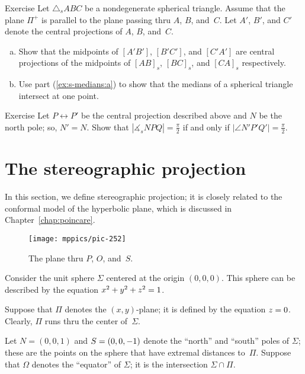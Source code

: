 \begin{thm}{Exercise}\label{ex:s-medians}
Let $\triangle_sABC$ be a nondegenerate spherical triangle.
Assume that the plane $\Pi^+$ is parallel to the plane passing thru $A$, $B$, and~$C$.
Let $A'$, $B'$, and $C'$ denote the central projections of $A$, $B$, and~$C$.
\begin{enumerate}[(a)]
\item\label{ex:s-medians:a} Show that the midpoints of $[A'B']$, $[B'C']$, and $[C'A']$
are central projections of the midpoints of $[AB]_s$, $[BC]_s$, and $[CA]_s$ respectively.
\item\label{ex:s-medians:b} Use part (\ref{ex:s-medians:a}) to show that the medians of a spherical triangle intersect at one point.
\end{enumerate}

\end{thm}


\begin{thm}{Exercise}\label{ex:s-altitudes}
Let $P\leftrightarrow P'$ be the central projection described above
and $N$ be the north pole; so, $N'=N$.
Show that $|\measuredangle_s NPQ|=\tfrac\pi2$ if and only if $|\angle N'P'Q'|=\tfrac\pi2$.
\end{thm}

\section{The stereographic projection}

In this section, we define stereographic projection;
it is closely related to the conformal model of the hyperbolic plane, which is discussed in Chapter~\ref{chap:poincare}.

{

\begin{wrapfigure}{r}{48mm}
\vskip-6mm
\centering
\texttt{[image: mppics/pic-252]}
\caption*{The plane thru $P$, $O$, and~$S$.}
\end{wrapfigure}

Consider the unit sphere $\Sigma$ 
centered at the origin $(0,0,0)$.
This sphere can be described by the equation $x^2+y^2+z^2=1$. 

Suppose that $\Pi$ denotes the $(x,y)$-plane;
it is defined by the equation $z = 0$.
Clearly, $\Pi$
runs thru the center of~$\Sigma$.

Let $N = (0, 0, 1)$ and $S=(0, 0, -1)$ denote the ``north'' and ``south'' poles of $\Sigma$;
these are the points on the sphere that have extremal distances to~$\Pi$.
Suppose that $\Omega$ denotes the ``equator'' of $\Sigma$;
it is the intersection $\Sigma\cap\Pi$.

}


